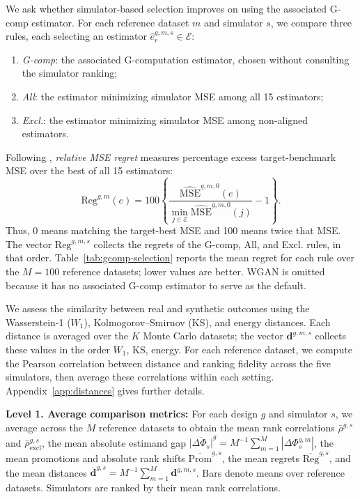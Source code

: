 We ask whether simulator-based selection improves on using the associated G-comp estimator. For each reference dataset $m$ and simulator $s$, we compare three rules, each selecting an estimator $\widehat e_r^{g,m,s}\in\mathcal E$:
\begin{enumerate}
    \item \emph{G-comp}: the associated G-computation estimator, chosen without consulting the simulator ranking;
    \item \emph{All}: the estimator minimizing simulator MSE among all 15 estimators;
    \item \emph{Excl.}: the estimator minimizing simulator MSE among non-aligned estimators.
\end{enumerate}
Following , \emph{relative MSE regret} measures percentage excess target-benchmark MSE over the best of all 15 estimators:
\begin{equation}
\mathrm{Reg}^{g,m}(e)
=100\left\{
\frac{\widehat{\mathrm{MSE}}^{g,m,0}(e)}
{\min_{j\in\mathcal E}\widehat{\mathrm{MSE}}^{g,m,0}(j)}-1
\right\}.
\label{eq:relative-mse-regret}
\end{equation}
Thus, 0 means matching the target-best MSE and 100 means twice that MSE. The vector \(\boldsymbol{\mathrm{Reg}}^{g,m,s}\) collects the regrets of the G-comp, All, and Excl. rules, in that order. Table~\ref{tab:gcomp-selection} reports the mean regret for each rule over the $M=100$ reference datasets; lower values are better. WGAN is omitted because it has no associated G-comp estimator to serve as the default.

We assess the similarity between real and synthetic outcomes using the Wasserstein-1 (\(W_1\)), Kolmogorov--Smirnov (KS), and energy distances. Each distance is averaged over the \(K\) Monte Carlo datasets; the vector \(\boldsymbol d^{g,m,s}\) collects these values in the order \(W_1\), KS, energy. For each reference dataset, we compute the Pearson correlation between distance and ranking fidelity across the five simulators, then average these correlations within each setting. Appendix~\ref{app:distances} gives further details.

\medskip

\noindent\textbf{Level 1. Average comparison metrics:} For each design \(g\) and simulator \(s\), we average across the \(M\) reference datasets to obtain the mean rank correlations \(\bar\rho^{g,s}\) and \(\bar\rho_{\mathrm{excl}}^{g,s}\), the mean absolute estimand gap \(\overline{|\Delta\Phi_s|}^{g}=M^{-1}\sum_{m=1}^{M}|\Delta\Phi_s^{g,m}|\), the mean promotions and absolute rank shifts \(\overline{\boldsymbol{\mathrm{Prom}}}^{g,s}\), the mean regrets \(\overline{\boldsymbol{\mathrm{Reg}}}^{g,s}\), and the mean distances \(\overline{\boldsymbol d}^{g,s}=M^{-1}\sum_{m=1}^{M}\boldsymbol d^{g,m,s}\). Bars denote means over reference datasets. Simulators are ranked by their mean rank correlations.

